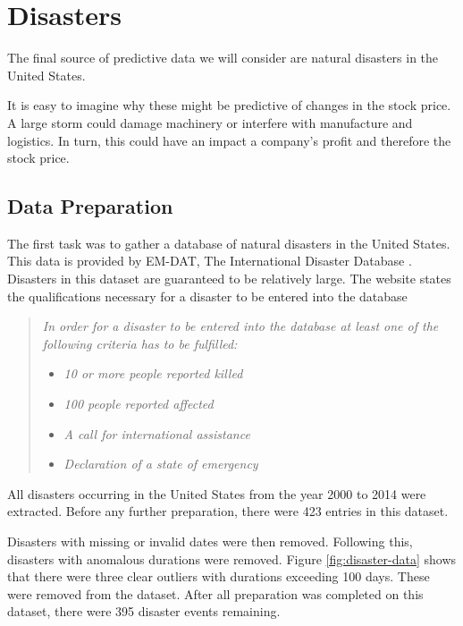 \documentclass{report}
\begin{document}
\section{Disasters}

The final source of predictive data we will consider are natural disasters in the United States. 

It is easy to imagine why these might be predictive of changes in the stock price. A large storm could damage machinery or interfere with manufacture and logistics. In turn, this could have an impact a company's profit and therefore the stock price.

\subsection{Data Preparation}

The first task was to gather a database of natural disasters in the United States. This data is provided by EM-DAT, The International Disaster Database \cite{disasterdb}. Disasters in this dataset are guaranteed to be relatively large. The website states the qualifications necessary for a disaster to be entered into the database

\begin{quotation}
\textit{In order for a disaster to be entered into the database at least one of the following criteria has to be fulfilled:}
\begin{itemize}
  \item \textit{10 or more people reported killed}
  \item \textit{100 people reported affected}
  \item \textit{A call for international assistance}
  \item \textit{Declaration of a state of emergency}
\end{itemize}
\end{quotation}

 All disasters occurring in the United States from the year 2000 to 2014 were extracted. Before any further preparation, there were 423 entries in this dataset.

Disasters with missing or invalid dates were then removed. Following this, disasters with anomalous durations were removed. Figure \ref{fig:disaster-data} shows that there were three clear outliers with durations exceeding 100 days. These were removed from the dataset. After all preparation was completed on this dataset, there were 395 disaster events remaining.
\end{document}
